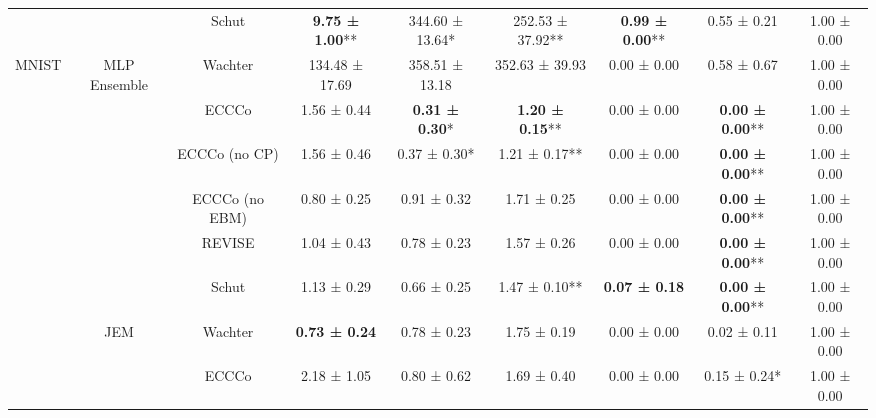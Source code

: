 \begin{table}
{\begin{tabular}[t]{ccccccccc}
 &  & Schut & \textbf{9.75 ± 1.00}** & 344.60 ± 13.64*\hphantom{*} & 252.53 ± 37.92** & \textbf{0.99 ± 0.00}** & 0.55 ± 0.21\hphantom{*}\hphantom{*} & 1.00 ± 0.00\hphantom{*}\hphantom{*}\\

\multirow[t]{-16}{*}{\centering\arraybackslash MNIST} & \multirow[t]{-4}{*}{\centering\arraybackslash MLP Ensemble} & Wachter & 134.48 ± 17.69\hphantom{*}\hphantom{*} & 358.51 ± 13.18\hphantom{*}\hphantom{*} & 352.63 ± 39.93\hphantom{*}\hphantom{*} & 0.00 ± 0.00\hphantom{*}\hphantom{*} & 0.58 ± 0.67\hphantom{*}\hphantom{*} & 1.00 ± 0.00\hphantom{*}\hphantom{*}\\
\cmidrule{1-9}
 &  & ECCCo & 1.56 ± 0.44\hphantom{*}\hphantom{*} & \textbf{0.31 ± 0.30}*\hphantom{*} & \textbf{1.20 ± 0.15}** & 0.00 ± 0.00\hphantom{*}\hphantom{*} & \textbf{0.00 ± 0.00}** & 1.00 ± 0.00\hphantom{*}\hphantom{*}\\

 &  & ECCCo (no CP) & 1.56 ± 0.46\hphantom{*}\hphantom{*} & 0.37 ± 0.30*\hphantom{*} & 1.21 ± 0.17** & 0.00 ± 0.00\hphantom{*}\hphantom{*} & \textbf{0.00 ± 0.00}** & 1.00 ± 0.00\hphantom{*}\hphantom{*}\\

 &  & ECCCo (no EBM) & 0.80 ± 0.25\hphantom{*}\hphantom{*} & 0.91 ± 0.32\hphantom{*}\hphantom{*} & 1.71 ± 0.25\hphantom{*}\hphantom{*} & 0.00 ± 0.00\hphantom{*}\hphantom{*} & \textbf{0.00 ± 0.00}** & 1.00 ± 0.00\hphantom{*}\hphantom{*}\\

 &  & REVISE & 1.04 ± 0.43\hphantom{*}\hphantom{*} & 0.78 ± 0.23\hphantom{*}\hphantom{*} & 1.57 ± 0.26\hphantom{*}\hphantom{*} & 0.00 ± 0.00\hphantom{*}\hphantom{*} & \textbf{0.00 ± 0.00}** & 1.00 ± 0.00\hphantom{*}\hphantom{*}\\

 &  & Schut & 1.13 ± 0.29\hphantom{*}\hphantom{*} & 0.66 ± 0.25\hphantom{*}\hphantom{*} & 1.47 ± 0.10** & \textbf{0.07 ± 0.18}\hphantom{*}\hphantom{*} & \textbf{0.00 ± 0.00}** & 1.00 ± 0.00\hphantom{*}\hphantom{*}\\

 & \multirow[t]{-6}{*}{\centering\arraybackslash JEM} & Wachter & \textbf{0.73 ± 0.24}\hphantom{*}\hphantom{*} & 0.78 ± 0.23\hphantom{*}\hphantom{*} & 1.75 ± 0.19\hphantom{*}\hphantom{*} & 0.00 ± 0.00\hphantom{*}\hphantom{*} & 0.02 ± 0.11\hphantom{*}\hphantom{*} & 1.00 ± 0.00\hphantom{*}\hphantom{*}\\
\cmidrule{2-9}
 &  & ECCCo & 2.18 ± 1.05\hphantom{*}\hphantom{*} & 0.80 ± 0.62\hphantom{*}\hphantom{*} & 1.69 ± 0.40\hphantom{*}\hphantom{*} & 0.00 ± 0.00\hphantom{*}\hphantom{*} & 0.15 ± 0.24*\hphantom{*} & 1.00 ± 0.00\hphantom{*}\hphantom{*}\\


\end{tabular}}
\end{table}
